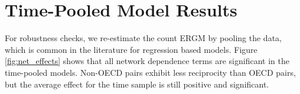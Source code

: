 \documentclass[reqno,onecolumn,letterpaper,12pt]{article}
\begin{document}
\clearpage

\section{Time-Pooled Model Results}\label{pooledresults}
For robustness checks, we re-estimate the count ERGM by pooling the data, which is common in the literature for regression based models. Figure \ref{fig:net_effects} shows that all network dependence terms are significant in the time-pooled models. Non-OECD pairs exhibit less reciprocity than OECD pairs, but the average effect for the time sample is still positive and significant.





\end{document}
